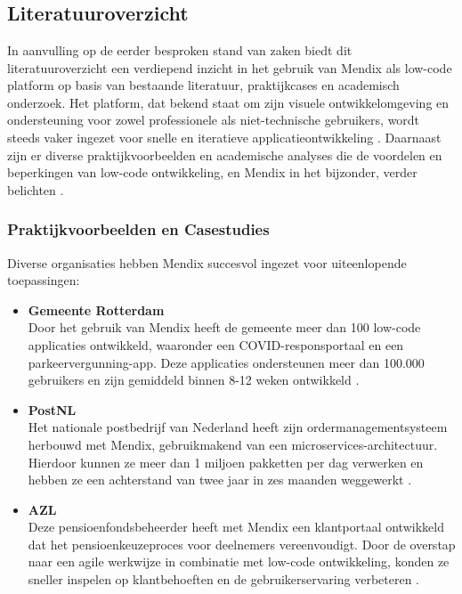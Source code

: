 
\chapter{}%
\label{ch:beter}



\section{Literatuuroverzicht}

In aanvulling op de eerder besproken stand van zaken biedt dit literatuuroverzicht een verdiepend inzicht in het gebruik van Mendix als low-code platform op basis van bestaande literatuur, praktijkcases en academisch onderzoek. Het platform, dat bekend staat om zijn visuele ontwikkelomgeving en ondersteuning voor zowel professionele als niet-technische gebruikers, wordt steeds vaker ingezet voor snelle en iteratieve applicatieontwikkeling \autocite{Alamin2021}. Daarnaast zijn er diverse praktijkvoorbeelden en academische analyses die de voordelen en beperkingen van low-code ontwikkeling, en Mendix in het bijzonder, verder belichten \autocite{Gadia2025}.
\subsection{Praktijkvoorbeelden en Casestudies}
Diverse organisaties hebben Mendix succesvol ingezet voor uiteenlopende toepassingen:
\begin{itemize}
    \item \textbf{Gemeente Rotterdam}
    \\
    Door het gebruik van Mendix heeft de gemeente meer dan 100 low-code applicaties ontwikkeld, waaronder een COVID-responsportaal en een parkeervergunning-app. Deze applicaties ondersteunen meer dan 100.000 gebruikers en zijn gemiddeld binnen 8-12 weken ontwikkeld \autocite{Mendix2025a}.
    \item \textbf{PostNL}
    \\
    Het nationale postbedrijf van Nederland heeft zijn ordermanagementsysteem herbouwd met Mendix, gebruikmakend van een microservices-architectuur. Hierdoor kunnen ze meer dan 1 miljoen pakketten per dag verwerken en hebben ze een achterstand van twee jaar in zes maanden weggewerkt \autocite{Zaman2024}.
    \item \textbf{AZL}
    \\
    Deze pensioenfondsbeheerder heeft met Mendix een klantportaal ontwikkeld dat het pensioenkeuzeproces voor deelnemers vereenvoudigt. Door de overstap naar een agile werkwijze in combinatie met low-code ontwikkeling, konden ze sneller inspelen op klantbehoeften en de gebruikerservaring verbeteren \autocite{MendixAZL}.
\end{itemize}
